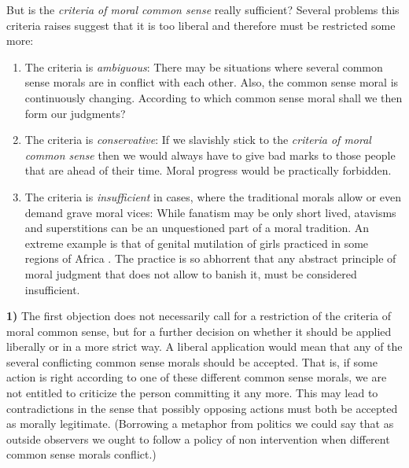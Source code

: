 \documentclass[12pt,a4paper,ngerman]{article}
\begin{document}
But is the {\em criteria of moral common sense} really sufficient?
Several problems this criteria raises suggest that it is too liberal
and therefore must be restricted some more:

\begin{enumerate}

\item The criteria is {\em ambiguous}: There may be situations where several
  common sense morals are in conflict with each other. Also, the common sense
  moral is continuously changing. According to which common sense moral
  shall we then form our judgments?

\item The criteria is {\em conservative}: If we slavishly stick to the {\em
    criteria of moral common sense} then we would always have to give
  bad marks to those people that are ahead of their time. Moral progress
  would be practically forbidden.
  
\item The criteria is {\em insufficient} in cases, where the traditional
  morals allow or even demand grave moral vices: While fanatism may be only
  short lived, atavisms and superstitions can be an unquestioned part of a
  moral tradition. An extreme example is that of genital mutilation of girls
  practiced in some regions of Africa \cite[]{amnesty:2004}. The practice is so
  abhorrent that any abstract principle of moral judgment that does not allow
  to banish it, must be considered insufficient.

\end{enumerate} 

{\bf 1)} The first objection does not necessarily call for a
restriction of the criteria of moral common sense, but for a further
decision on whether it should be applied liberally or in a more strict
way. A liberal application would mean that any of the several
conflicting common sense morals should be accepted. That is, if some
action is right according to one of these different common sense
morals, we are not entitled to criticize the person committing it any
more. This may lead to contradictions in the sense that possibly
opposing actions must both be accepted as morally legitimate.
(Borrowing a metaphor from politics we could say that as outside
observers we ought to follow a policy of non intervention when
different common sense morals conflict.)
\end{document}
